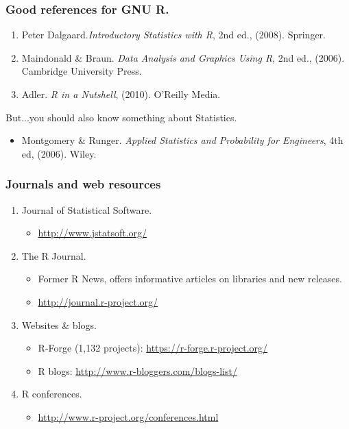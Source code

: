 \documentclass{beamer}
\begin{document}

\begin{frame}

 \frametitle{Good references for GNU R.}
 \begin{enumerate}
  \item Peter Dalgaard.\textit{Introductory Statistics with R}, 2nd ed., (2008). Springer.
  \item Maindonald \& Braun. \textit{Data Analysis and Graphics Using R}, 2nd ed., (2006).
  Cambridge University Press.
  \item Adler. \textit{R in a Nutshell}, (2010). O'Reilly Media.
  
 \end{enumerate}
 But...you should also know something about Statistics.
 \begin{itemize}
  \item Montgomery \& Runger. \textit{Applied Statistics and Probability for Engineers},
  4th ed, (2006). Wiley.
 \end{itemize}

\end{frame}


\begin{frame}

 \frametitle{Journals and web resources}
 \begin{enumerate}

  \item Journal of Statistical Software.
  \begin{itemize}
    \item \url{http://www.jstatsoft.org/}
  \end{itemize}

  \item The R Journal.
    \begin{itemize}
      \item Former R News, offers informative articles on libraries and
      new releases.
      \item \url{http://journal.r-project.org/}
    \end{itemize}

   \item Websites \& blogs.
    \begin{itemize}
      \item R-Forge (1,132 projects): \url{https://r-forge.r-project.org/}
      \item R blogs: \url{http://www.r-bloggers.com/blogs-list/}
    \end{itemize}

   \item R conferences.
     \begin{itemize}
      \item \url{http://www.r-project.org/conferences.html}
     \end{itemize}


 \end{enumerate}

\end{frame}

\end{document}
